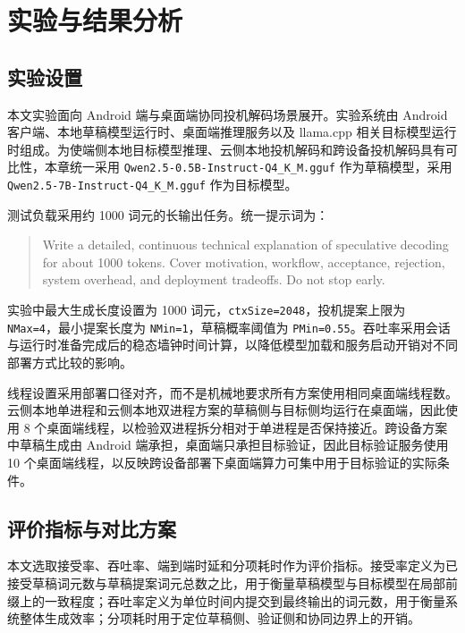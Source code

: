 \section{实验与结果分析}

\subsection{实验设置}

本文实验面向 Android 端与桌面端协同投机解码场景展开。实验系统由 Android 客户端、本地草稿模型运行时、桌面端推理服务以及 llama.cpp 相关目标模型运行时组成。为使端侧本地目标模型推理、云侧本地投机解码和跨设备投机解码具有可比性，本章统一采用 \texttt{Qwen2.5-0.5B-Instruct-Q4\_K\_M.gguf} 作为草稿模型，采用 \texttt{Qwen2.5-7B-Instruct-Q4\_K\_M.gguf} 作为目标模型。

测试负载采用约 1000 词元的长输出任务。统一提示词为：

\begin{quote}
Write a detailed, continuous technical explanation of speculative decoding for about 1000 tokens. Cover motivation, workflow, acceptance, rejection, system overhead, and deployment tradeoffs. Do not stop early.
\end{quote}

实验中最大生成长度设置为 1000 词元，\texttt{ctxSize=2048}，投机提案上限为 \texttt{NMax=4}，最小提案长度为 \texttt{NMin=1}，草稿概率阈值为 \texttt{PMin=0.55}。吞吐率采用会话与运行时准备完成后的稳态墙钟时间计算，以降低模型加载和服务启动开销对不同部署方式比较的影响。

线程设置采用部署口径对齐，而不是机械地要求所有方案使用相同桌面端线程数。云侧本地单进程和云侧本地双进程方案的草稿侧与目标侧均运行在桌面端，因此使用 8 个桌面端线程，以检验双进程拆分相对于单进程是否保持接近。跨设备方案中草稿生成由 Android 端承担，桌面端只承担目标验证，因此目标验证服务使用 10 个桌面端线程，以反映跨设备部署下桌面端算力可集中用于目标验证的实际条件。

\subsection{评价指标与对比方案}

本文选取接受率、吞吐率、端到端时延和分项耗时作为评价指标。接受率定义为已接受草稿词元数与草稿提案词元总数之比，用于衡量草稿模型与目标模型在局部前缀上的一致程度；吞吐率定义为单位时间内提交到最终输出的词元数，用于衡量系统整体生成效率；分项耗时用于定位草稿侧、验证侧和协同边界上的开销。

